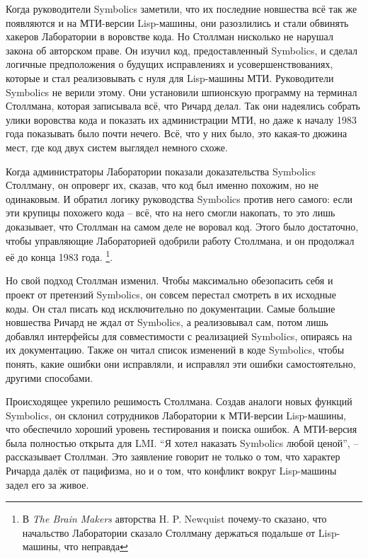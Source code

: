 Когда руководители Symbolics заметили, что их последние новшества всё так же появляются и на МТИ-версии Lisp-машины, они разозлились и стали обвинять хакеров Лаборатории в воровстве кода. Но Столлман нисколько не нарушал закона об авторском праве. Он изучил код, предоставленный Symbolics, и сделал логичные предположения о будущих исправлениях и усовершенствованиях, которые и стал реализовывать с нуля для Lisp-машины МТИ. Руководители Symbolics не верили этому. Они установили шпионскую программу на терминал Столлмана, которая записывала всё, что Ричард делал. Так они надеялись собрать улики воровства кода и показать их администрации МТИ, но даже к началу 1983 года показывать было почти нечего. Всё, что у них было, это какая-то дюжина мест, где код двух систем выглядел немного схоже.

Когда администраторы Лаборатории показали доказательства Symbolics Столлману, он опроверг их, сказав, что код был именно похожим, но не одинаковым. И обратил логику руководства Symbolics против него самого: если эти крупицы похожего кода -- всё, что на него смогли накопать, то это лишь доказывает, что Столлман на самом деле не воровал код. Этого было достаточно, чтобы управляющие Лабораторией одобрили работу Столлмана, и он продолжал её до конца 1983 года. \footnote{В \textit{The Brain Makers} авторства H. P. Newquist почему-то сказано, что начальство Лаборатории сказало Столлману держаться подальше от Lisp-машины, что неправда}.

Но свой подход Столлман изменил. Чтобы максимально обезопасить себя и проект от претензий Symbolics, он совсем перестал смотреть в их исходные коды. Он стал писать код исключительно по документации. Самые большие новшества Ричард не ждал от Symbolics, а реализовывал сам, потом лишь добавлял интерфейсы для совместимости с реализацией Symbolics, опираясь на их документацию. Также он читал список изменений в коде Symbolics, чтобы понять, какие ошибки они исправляли, и исправлял эти ошибки самостоятельно, другими способами.

Происходящее укрепило решимость Столлмана. Создав аналоги новых функций Symbolics, он склонил сотрудников Лаборатории к МТИ-версии Lisp-машины, что обеспечило хороший уровень тестирования и поиска ошибок. А МТИ-версия была полностью открыта для LMI. \enquote{Я хотел наказать Symbolics любой ценой}, -- рассказывает Столлман. Это заявление говорит не только о том, что характер Ричарда далёк от пацифизма, но и о том, что конфликт вокруг Lisp-машины задел его за живое.

